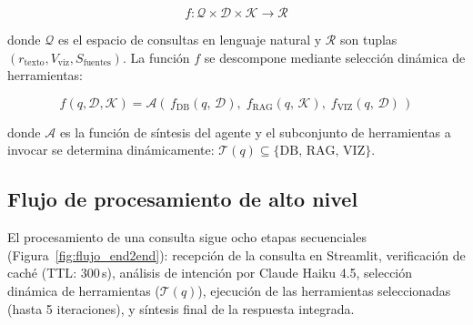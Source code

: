 \begin{equation}
f: \mathcal{Q} \times \mathcal{D} \times \mathcal{K} \rightarrow \mathcal{R}
\label{eq:sistema}
\end{equation}

donde $\mathcal{Q}$ es el espacio de consultas en lenguaje natural y $\mathcal{R}$ son tuplas $(r_\text{texto}, V_\text{viz}, S_\text{fuentes})$. La función $f$ se descompone mediante selección dinámica de herramientas:

\begin{equation}
f(q, \mathcal{D}, \mathcal{K}) = \mathcal{A}\!\left(\,f_\text{DB}(q,\,\mathcal{D}),\; f_\text{RAG}(q,\,\mathcal{K}),\; f_\text{VIZ}(q,\,\mathcal{D})\,\right)
\label{eq:descomposicion}
\end{equation}

donde $\mathcal{A}$ es la función de síntesis del agente y el subconjunto de herramientas a invocar se determina dinámicamente: $\mathcal{T}(q) \subseteq \{\text{DB},\, \text{RAG},\, \text{VIZ}\}$.

\subsection{Flujo de procesamiento de alto nivel}

El procesamiento de una consulta sigue ocho etapas secuenciales (Figura~\ref{fig:flujo_end2end}): recepción de la consulta en Streamlit, verificación de caché (\ac{TTL}: 300\,s), análisis de intención por Claude Haiku 4.5, selección dinámica de herramientas ($\mathcal{T}(q)$), ejecución de las herramientas seleccionadas (hasta 5 iteraciones), y síntesis final de la respuesta integrada.

